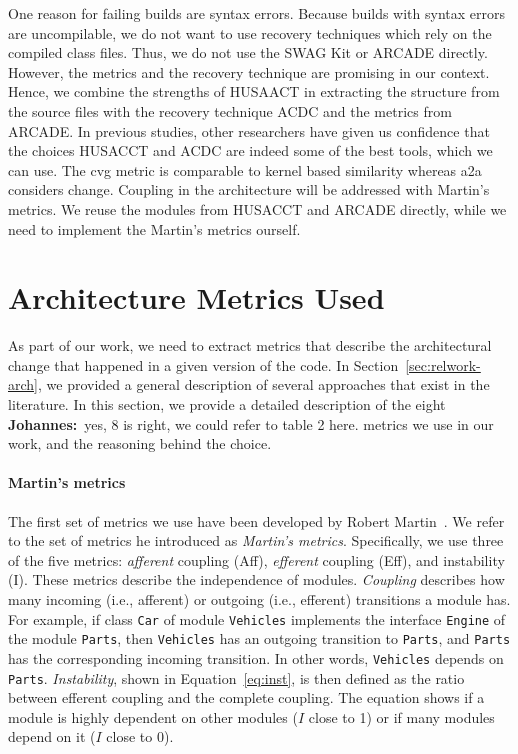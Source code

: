 \documentclass[sigplan, anonymous, review]{acmart}
\newcommand{\jk}[1]{{\color{violet}\textbf{Johannes:}~#1}}
\begin{document}
One reason for failing builds are syntax errors. Because builds with syntax errors are uncompilable, we do not want to use recovery techniques which rely on the compiled class files. Thus, we do not use the SWAG Kit or ARCADE directly.
However, the metrics and the recovery technique are promising in our context. Hence, we combine the strengths of HUSAACT in extracting the structure from the source files with the recovery technique ACDC and the metrics from ARCADE. 
In previous studies, other researchers \cite{MScSteffen, arcRec-comparison} have given us confidence that the choices HUSACCT and ACDC are indeed some of the best tools, which we can use.
The cvg metric is comparable to kernel based similarity whereas a2a considers change. Coupling in the architecture will be addressed with Martin's metrics. We reuse the modules from HUSACCT and ARCADE directly, while we need to implement the Martin's metrics ourself. 

\section{Architecture Metrics Used} \label{sec:Metrics}

As part of our work, we need to extract metrics that describe the architectural change that happened in a given version of the code. 
In Section~\ref{sec:relwork-arch}, we provided a general description of several approaches that exist in the literature.
In this section, we provide a detailed description of the eight \jk{yes, 8 is right, we could refer to table 2 here.} metrics we use in our work, and the reasoning behind the choice.


\paragraph{Martin's metrics} 
The first set of metrics we use have been developed by Robert Martin~\cite{martinsMetrics}.
We refer to the set of metrics he introduced as \textit{Martin's metrics}.
Specifically, we use three of the five metrics: \textit{afferent} coupling (Aff), \textit{efferent} coupling (Eff), and instability (I).
These metrics describe the independence of modules. 
\textit{Coupling} describes how many incoming (i.e., afferent) or outgoing (i.e., efferent) transitions a module has. 
For example, if class \texttt{Car} of module \texttt{Vehicles} implements the interface \texttt{Engine} of the module \texttt{Parts}, then \texttt{Vehicles} has an outgoing transition to \texttt{Parts}, and \texttt{Parts} has the corresponding incoming transition. 
In other words, \texttt{Vehicles} depends on \texttt{Parts}.
\textit{Instability}, shown in Equation~\ref{eq:inst}, is then defined as the ratio between efferent coupling and the complete coupling.
The equation shows if a module is highly dependent on other modules ($I$ close to 1) or if many modules depend on it ($I$ close to 0).
\end{document}
